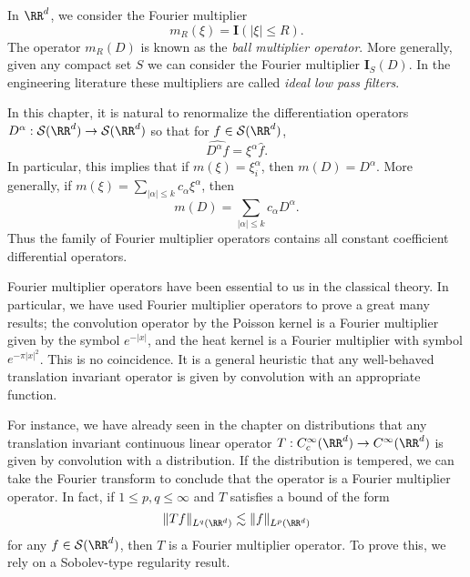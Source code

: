 \begin{example}
  In $\RR^d$, we consider the Fourier multiplier
  \[ m_R(\xi) = \mathbf{I}(|\xi| \leq R). \]
  The operator $m_R(D)$ is known as the \emph{ball multiplier operator}. More generally, given any compact set $S$ we can consider the Fourier multiplier $\mathbf{I}_S(D)$. In the engineering literature these multipliers are called \emph{ideal low pass filters}.
\end{example}

\begin{example}
  In this chapter, it is natural to renormalize the differentiation operators $D^\alpha: \mathcal{S}(\RR^d) \to \mathcal{S}(\RR^d)$ so that for $f \in \mathcal{S}(\RR^d)$,
  \[ \widehat{D^\alpha f} = \xi^\alpha \widehat{f}. \]
  In particular, this implies that if $m(\xi) = \xi_i^\alpha$, then $m(D) = D^\alpha$. More generally, if $m(\xi) = \sum_{|\alpha| \leq k} c_\alpha \xi^\alpha$, then
  \[ m(D) = \sum_{|\alpha| \leq k} c_\alpha D^\alpha. \]
  Thus the family of Fourier multiplier operators contains all constant coefficient differential operators.
\end{example}

Fourier multiplier operators have been essential to us in the classical theory. In particular, we have used Fourier multiplier operators to prove a great many results; the convolution operator by the Poisson kernel is a Fourier multiplier given by the symbol $e^{-|x|}$, and the heat kernel is a Fourier multiplier with symbol $e^{- \pi |x|^2}$. This is no coincidence. It is a general heuristic that any well-behaved translation invariant operator is given by convolution with an appropriate function.

For instance, we have already seen in the chapter on distributions that any translation invariant continuous linear operator $T: C_c^\infty(\RR^d) \to C^\infty(\RR^d)$ is given by convolution with a distribution. If the distribution is tempered, we can take the Fourier transform to conclude that the operator is a Fourier multiplier operator. In fact, if $1 \leq p,q \leq \infty$ and $T$ satisfies a bound of the form
%
\[ \| Tf \|_{L^q(\RR^d)} \lesssim \| f \|_{L^p(\RR^d)} \]
%
for any $f \in \mathcal{S}(\RR^d)$, then $T$ is a Fourier multiplier operator. To prove this, we rely on a Sobolev-type regularity result.

